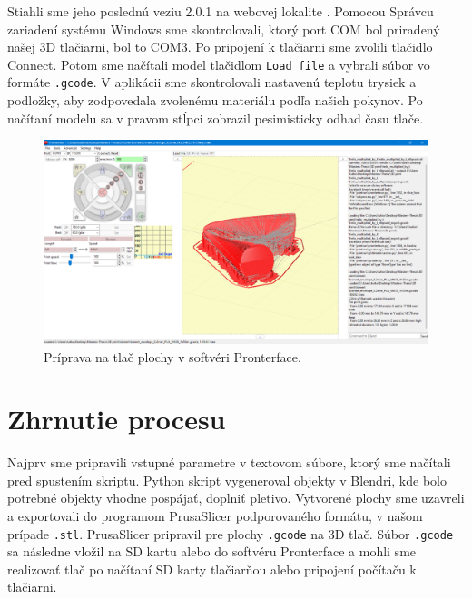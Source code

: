 Stiahli sme jeho poslednú veziu 2.0.1 na webovej lokalite \cite{Pronterface}. Pomocou Správcu zariadení systému Windows sme skontrolovali, ktorý port COM bol priradený našej 3D tlačiarni, bol to COM3. Po pripojení k tlačiarni sme zvolili tlačidlo Connect. Potom sme načítali model tlačidlom \verb|Load file| a vybrali súbor vo formáte \verb|.gcode|. V aplikácii sme skontrolovali nastavenú teplotu trysiek a podložky, aby zodpovedala zvolenému materiálu podľa našich pokynov. Po načítaní modelu sa v pravom stĺpci zobrazil pesimisticky odhad času tlače.

\begin{figure}[h]
	\centering
	\includegraphics[width=\textwidth]{images/pronterface.png}
	\caption[Softvér Pronterface.]{Príprava na tlač plochy v softvéri Pronterface.}
	\label{fig:pronterface}
\end{figure}

\section{Zhrnutie procesu}
Najprv sme pripravili vstupné parametre v textovom súbore, ktorý sme načítali pred spustením skriptu. Python skript vygeneroval objekty v Blendri, kde bolo potrebné objekty vhodne pospájať, doplniť pletivo. Vytvorené plochy sme uzavreli a exportovali do programom PrusaSlicer podporovaného formátu, v našom prípade \verb|.stl|. PrusaSlicer pripravil pre plochy \verb|.gcode| na 3D tlač. Súbor \verb|.gcode| sa následne vložil na SD kartu alebo do softvéru Pronterface a mohli sme realizovať tlač po načítaní SD karty tlačiarňou alebo pripojení počítaču k tlačiarni.

